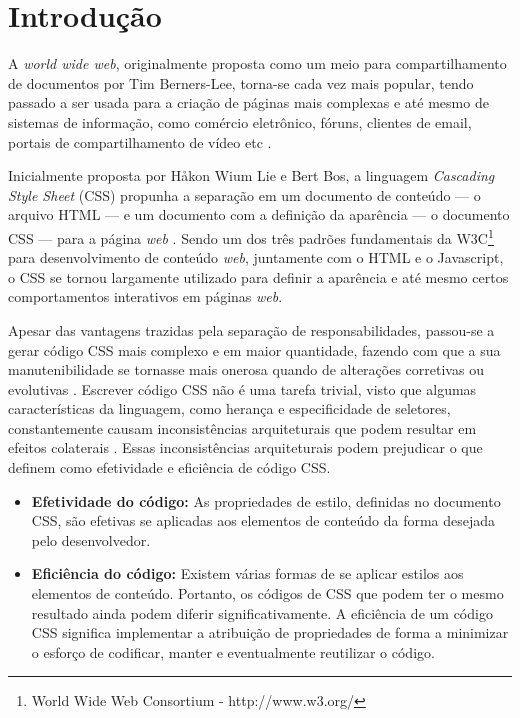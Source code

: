 \chapter{Introdução}
\label{chap:Intr}
A \textit{world wide web}, originalmente proposta como um meio para compartilhamento de documentos por Tim Berners-Lee, torna-se cada vez mais popular, tendo passado a ser usada para a criação de páginas mais complexas e até mesmo de sistemas de informação, como comércio eletrônico, fóruns, clientes de email, portais de compartilhamento de vídeo etc \cite{Berners-Lee:2000:WWO:556560}.

Inicialmente proposta por Håkon Wium Lie e Bert Bos, a linguagem \textit{Cascading Style Sheet} (CSS) propunha a separação em um documento de conteúdo --- o arquivo HTML --- e um documento com a definição da aparência --- o documento CSS --- para a página \textit{web} \cite{Hakon:2005}. Sendo um dos três padrões fundamentais da W3C\footnote{World Wide Web Consortium - http://www.w3.org/} para desenvolvimento de conteúdo \textit{web}, juntamente com o HTML e o Javascript, o CSS se tornou largamente utilizado para definir a aparência e até mesmo certos comportamentos interativos em páginas \textit{web}. 

Apesar das vantagens trazidas pela separação de responsabilidades, passou-se a gerar código CSS mais complexo e em maior quantidade, fazendo com que a sua manutenibilidade se tornasse mais onerosa quando de alterações corretivas ou evolutivas \cite{Mesbah2012}.
Escrever código CSS não é uma tarefa trivial, visto que algumas características da linguagem, como herança e especificidade de seletores, constantemente causam inconsistências arquiteturais que podem resultar em efeitos colaterais \cite{Walton:2015}.
Essas inconsistências arquiteturais podem prejudicar o que  definem como efetividade e eficiência de código CSS.

\begin{itemize}
	\item\textbf{Efetividade do código:} As propriedades de estilo, definidas no documento CSS, são efetivas se aplicadas aos elementos de conteúdo da forma desejada pelo desenvolvedor.
	
	\item\textbf{Eficiência do código:} Existem várias formas de se aplicar estilos aos elementos de conteúdo. Portanto, os códigos de CSS que podem ter o mesmo resultado ainda podem diferir significativamente. A eficiência de um código CSS significa implementar a atribuição de propriedades de forma a minimizar o esforço de codificar, manter e eventualmente reutilizar o código.
\end{itemize}

